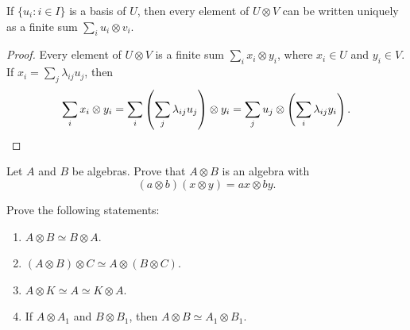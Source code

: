 \begin{corollary}
	If $\{u_i:i\in I\}$ is a basis of $U$, then every element of $U\otimes V$
	can be written uniquely as a finite sum $\sum_{i}u_i\otimes v_i$.
\end{corollary}

\begin{proof}
	Every element of $U\otimes V$ is a finite sum 
	$\sum_i x_i\otimes y_i$, where $x_i\in U$ and $y_i\in V$. If  
	$x_i=\sum_j\lambda_{ij}u_j$, then 
	\[
		\sum_i x_i\otimes y_i=\sum_i\left(\sum_j\lambda_{ij}u_j\right)\otimes y_i		
		=\sum_j u_j\otimes\left(\sum_i\lambda_{ij}y_i\right).\qedhere 
	\]
\end{proof}

%

\begin{exercise}
\label{xca:tensor_algebras}
    Let $A$ and $B$ be algebras. Prove that $A\otimes B$ 
    is an algebra with 
	\[
		(a\otimes b)(x\otimes y)=ax\otimes by.
	\]
\end{exercise}


\begin{exercise}
    Prove the following statements:
	\begin{enumerate}
		\item $A\otimes B\simeq B\otimes A$.
		\item $(A\otimes B)\otimes C\simeq A\otimes(B\otimes C)$.
		\item $A\otimes K\simeq A\simeq K\otimes A$.
		\item If $A\otimes A_1$ and $B\otimes B_1$, then $A\otimes B\simeq A_1\otimes B_1$.
	\end{enumerate}
\end{exercise}


